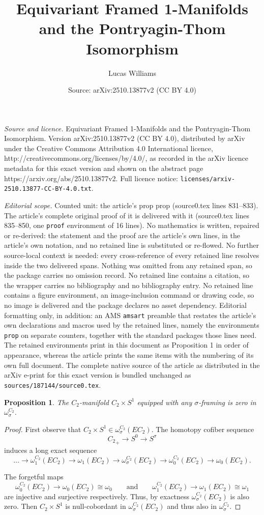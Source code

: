 \documentclass[10pt,a4paper]{amsart}
\title{Equivariant Framed 1-Manifolds and the Pontryagin-Thom Isomorphism}
\author{Lucas Williams}
\date{Source: arXiv:2510.13877v2 (CC BY 4.0)}
\newtheorem{prop}{Proposition}
\begin{document}
\maketitle

\noindent\emph{Source and licence.} Equivariant Framed 1-Manifolds and the Pontryagin-Thom Isomorphism. Version arXiv:2510.13877v2 (CC BY 4.0), distributed by arXiv under the Creative Commons Attribution 4.0 International licence, http://creativecommons.org/licenses/by/4.0/, as recorded in the arXiv licence metadata for this exact version and shown on the abstract page https://arxiv.org/abs/2510.13877v2. Full licence notice: \texttt{licenses/arxiv-2510.13877-CC-BY-4.0.txt}.\par\smallskip

\noindent\textit{Editorial scope.} Counted unit: the article's prop prop (source0.tex lines 831--833). The article's complete original proof of it is delivered with it (source0.tex lines 835--850, one \texttt{proof} environment of 16 lines). No mathematics is written, repaired or re-derived: the statement and the proof are the article's own lines, in the article's own notation, and no retained line is substituted or re-flowed.  No further source-local context is needed: every cross-reference of every retained line resolves inside the two delivered spans.  Nothing was omitted from any retained span, so the package carries no omission record.  No retained line contains a citation, so the wrapper carries no bibliography and no bibliography entry.  No retained line contains a figure environment, an image-inclusion command or drawing code, so no image is delivered and the package declares no asset dependency.  Editorial formatting only, in addition: an AMS \texttt{amsart} preamble that restates the article's own declarations and macros used by the retained lines, namely the environments \texttt{prop} on separate counters, together with the standard packages those lines need.  The retained environments print in this document as Proposition 1 in order of appearance, whereas the article prints the same items with the numbering of its own full document.  The complete native source of the article as distributed in the arXiv e-print for this exact version is bundled unchanged as \texttt{sources/187144/source0.tex}.
\begin{prop}
The $C_2$-manifold $C_2\times S^1$ equipped with any $\sigma$-framing is zero in $\omega_\sigma^{C_2}$. 
\end{prop}

\begin{proof}
First observe that $C_2\times S^1\in \omega_\sigma^{C_2}(EC_2)$. The homotopy cofiber sequence
\[
{C_2}_+\to S^0\to S^\sigma
\]
induces a long exact sequence
\[
\dots\to\omega_1^{C_2}(EC_2)\to \omega_1(EC_2)\to \omega_\sigma^{C_2}(EC_2) \to \omega_0^{C_2} (EC_2)\to \omega_0(EC_2). 
\]

The forgetful maps 
\[
\omega_0^{C_2}(EC_2)\to\omega_0(EC_2)\cong \omega_0 \qquad \text{and}\qquad \omega_1^{C_2}(EC_2)\to \omega_1(EC_2)\cong\omega_1
\]
are injective and surjective respectively. Thus, by exactness $\omega_\sigma^{C_2}(EC_2)$ is also zero. Then $C_2\times S^1$ is null-cobordant in $\omega_\sigma^{C_2}(EC_2)$ and thus also in $\omega_\sigma^{C_2}$. 
\end{proof}
\end{document}
